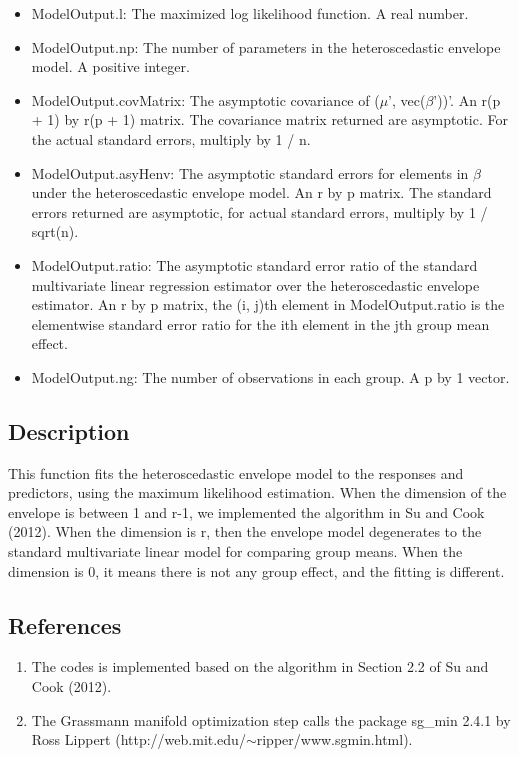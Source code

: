 \documentclass[a4paper,11pt,openany]{memoir}
\begin{document}
\begin{itemize}
   \item ModelOutput.l: The maximized log likelihood function.  A real number.
   \item ModelOutput.np: The number of parameters in the heteroscedastic envelope model.  A positive integer.
   \item ModelOutput.covMatrix: The asymptotic covariance of ($\mu$', vec($\beta$'))'.  An r(p + 1) by r(p + 1) matrix.  The covariance matrix returned are asymptotic.  For the actual standard errors, multiply by 1 / n.
   \item ModelOutput.asyHenv: The asymptotic standard errors for elements in $\beta$ under the heteroscedastic envelope model. An r by p matrix.  The standard errors returned are asymptotic, for actual standard errors, multiply by 1 / sqrt(n).
   \item ModelOutput.ratio: The asymptotic standard error ratio of the standard multivariate linear regression estimator over the heteroscedastic envelope estimator. An r by p matrix, the (i, j)th element in ModelOutput.ratio is the elementwise standard error ratio for the ith element in the jth group mean effect.
   \item ModelOutput.ng: The number of observations in each group.  A p by 1 vector.
\end{itemize}


\subsection*{Description}

\begin{par}
This function fits the heteroscedastic envelope model to the responses and predictors, using the maximum likelihood estimation.  When the dimension of the envelope is between 1 and r-1, we implemented the algorithm in Su and Cook (2012). When the dimension is r, then the envelope model degenerates to the standard multivariate linear model for comparing group means.  When the dimension is 0, it means there is not any group effect, and the fitting is different.
\end{par} \vspace{1em}


\subsection*{References}

\begin{enumerate}
\setlength{\itemsep}{-1ex}
   \item The codes is implemented based on the algorithm in Section 2.2 of Su and Cook (2012).
   \item The Grassmann manifold optimization step calls the package sg\_min 2.4.1 by Ross Lippert (http://web.mit.edu/$\sim$ripper/www.sgmin.html).
\end{enumerate}
\end{document}
